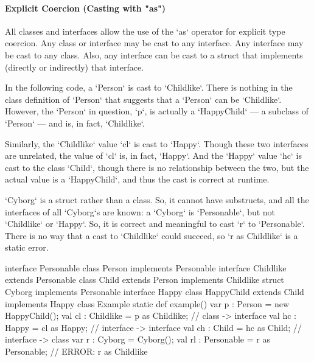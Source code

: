 \paragraph{Explicit Coercion (Casting with \xcd"as")}

All classes and interfaces allow the use of the \xcd`as` operator for explicit
type coercion.  
Any class or
interface may be cast to any interface.  
Any interface may be cast to
any class.  Also, any interface can be cast to a struct that implements
(directly or indirectly) that interface.

\begin{ex}
In the following code, a \xcd`Person` is cast to \xcd`Childlike`.  There is
nothing in the class definition of \xcd`Person` that suggests that a
\xcd`Person` can be \xcd`Childlike`.  However, the \xcd`Person` in question,
\xcd`p`, is actually a \xcd`HappyChild` --- a subclass of \xcd`Person` --- and
is, in fact, \xcd`Childlike`.  

Similarly, the \xcd`Childlike` value \xcd`cl` is cast to \xcd`Happy`.  Though
these two interfaces are unrelated, the value of \xcd`cl` is, in fact,
\xcd`Happy`.  And the \xcd`Happy` value \xcd`hc` is cast to the class
\xcd`Child`, though there is no relationship between the two, but the actual
value is a \xcd`HappyChild`, and thus the cast is correct at runtime.

\xcd`Cyborg` is a struct rather than a class.  So, it cannot have substructs,
and all the interfaces of all \xcd`Cyborg`s are known: a \xcd`Cyborg` is
\xcd`Personable`, but not \xcd`Childlike` or \xcd`Happy`.  So, it is correct
and meaningful to cast \xcd`r` to \xcd`Personable`.  There is no way that a
cast to \xcd`Childlike` could succeed, so \xcd`r as Childlike` is a static error.

\begin{xten}
interface Personable {}
class Person implements Personable {}
interface Childlike extends Personable {}
class Child extends Person implements Childlike {}
struct Cyborg implements Personable {}
interface Happy {}
class HappyChild extends Child implements Happy {}
class Example {
  static def example() {
    var p : Person = new HappyChild();
    val cl : Childlike = p as Childlike; // class -> interface
    val hc : Happy = cl as Happy; //        interface -> interface
    val ch : Child = hc as Child; //        interface -> class
    var r : Cyborg = Cyborg();
    val rl : Personable = r as Personable; 
    // ERROR: r as Childlike
  }
}
\end{xten}




\end{ex}


